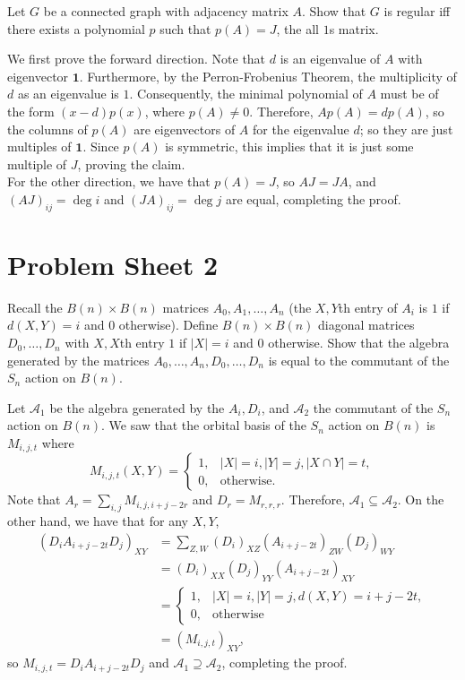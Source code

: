 \documentclass{article}
\begin{document}
	\begin{problem}
		Let $G$ be a connected graph with adjacency matrix $A$. Show that $G$ is regular iff there exists a polynomial $p$ such that $p(A) = J$, the all $1$s matrix.
	\end{problem}
	\begin{solution*}
		We first prove the forward direction. Note that $d$ is an eigenvalue of $A$ with eigenvector $\mathbf{1}$. Furthermore, by the Perron-Frobenius Theorem, the multiplicity of $d$ as an eigenvalue is $1$. Consequently, the minimal polynomial of $A$ must be of the form $(x-d)p(x)$, where $p(A) \ne 0$. Therefore, $Ap(A) = dp(A)$, so the columns of $p(A)$ are eigenvectors of $A$ for the eigenvalue $d$; so they are just multiples of $\mathbf{1}$. Since $p(A)$ is symmetric, this implies that it is just some multiple of $J$, proving the claim.\\
		For the other direction, we have that $p(A) = J$, so $AJ = JA$, and $(AJ)_{ij} = \deg i$ and $(JA)_{ij} = \deg j$ are equal, completing the proof.
	\end{solution*}

\section{Problem Sheet 2}

	\begin{problem}
		Recall the $B(n) \times B(n)$ matrices $A_0,A_1,\ldots,A_n$ (the $X,Y$th entry of $A_i$ is $1$ if $d(X,Y) = i$ and $0$ otherwise). Define $B(n) \times B(n)$ diagonal matrices $D_0,\ldots,D_n$ with $X,X$th entry $1$ if $|X| = i$ and $0$ otherwise. Show that the algebra generated by the matrices $A_0,\ldots,A_n,D_0,\ldots,D_n$ is equal to the commutant of the $S_n$ action on $B(n)$.
	\end{problem}
	\begin{solution*}
		Let $\mathcal{A}_1$ be the algebra generated by the $A_i,D_i$, and $\mathcal{A}_2$ the commutant of the $S_n$ action on $B(n)$. We saw that the orbital basis of the $S_n$ action on $B(n)$ is $M_{i,j,t}$ where
		\[ M_{i,j,t}(X,Y) = \begin{cases} 1, & |X|=i, |Y|=j, |X \cap Y| = t, \\ 0, & \text{otherwise.} \end{cases} \]
		Note that $A_r = \sum_{i,j} M_{i,j,i+j-2r}$ and $D_r = M_{r,r,r}$. Therefore, $\mathcal{A}_1 \subseteq \mathcal{A}_2$. On the other hand, we have that for any $X,Y$,
		\begin{align*}
			(D_i A_{i+j-2t} D_j)_{XY} &= \sum_{Z,W} (D_i)_{XZ} (A_{i+j-2t})_{ZW} (D_j)_{WY} \\
				&= (D_i)_{XX} (D_j)_{YY} (A_{i+j-2t})_{XY} \\
				&= \begin{cases} 1, & |X|=i, |Y|=j, d(X,Y)=i+j-2t, \\ 0, & \text{otherwise} \end{cases} \\
				&= (M_{i,j,t})_{XY},
		\end{align*}
		so $M_{i,j,t} = D_i A_{i+j-2t} D_j$ and $\mathcal{A}_1 \supseteq \mathcal{A}_2$, completing the proof.
	\end{solution*}
\end{document}
